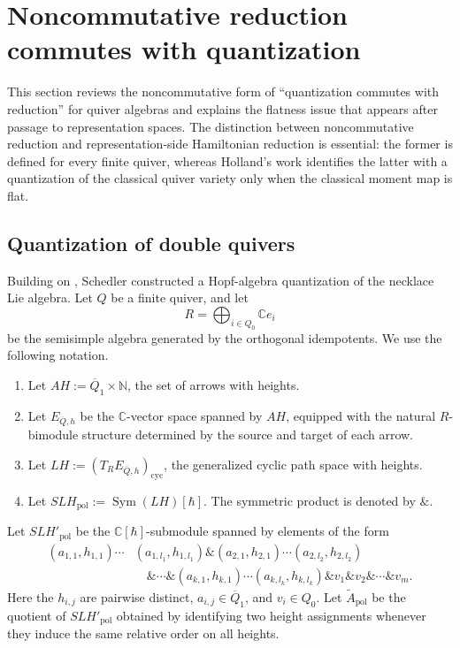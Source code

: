 \documentclass[11pt,reqno]{amsart}
\theoremstyle{definition}
\newcommand{\bbC}{\mathbb{C}}
\newcommand{\cyc}{\mathrm{cyc}}
\begin{document}
\section{Noncommutative reduction commutes with quantization}\label{sec: noncom Ham red}

This section reviews the noncommutative form of ``quantization commutes with reduction'' for quiver algebras and explains the flatness issue that appears after passage to representation spaces.
The distinction between noncommutative reduction and representation-side Hamiltonian reduction is essential: the former is defined for every finite quiver, whereas Holland's work identifies the latter with a quantization of the classical quiver variety only when the classical moment map is flat.

\subsection{Quantization of double quivers}
\label{subsec: nc quant}


Building on \cite{Tur1991Ske}, Schedler \cite{Sch2005} constructed a
Hopf-algebra quantization of the necklace Lie algebra.
Let \(Q\) be a finite quiver, and let
\[
R=\bigoplus_{i\in Q_0}\bbC e_i
\]
be the semisimple algebra generated by the orthogonal idempotents. We use the following notation.
\begin{enumerate}
\item Let \(AH:=\overline{Q}_1\times\mathbb{N}\), {the set of arrows with heights}.

\item Let \(E_{\overline{Q},h}\) be the \(\mathbb{C}\)-vector space spanned by \(AH\), {equipped with the natural \(R\)-bimodule structure determined by the source and target of each arrow.}

\item Let \(LH:=(T_RE_{\overline{Q},h})_\cyc\), {the generalized cyclic path space with heights}.

\item Let \(SLH_{\mathrm{pol}}:=\operatorname{Sym}(LH)[\hbar]\). The symmetric product is denoted by \(\&\).
\end{enumerate}

Let \(SLH'_{\mathrm{pol}}\) be the \(\mathbb{C}[\hbar]\)-submodule
spanned by elements of the form
\begin{equation}
\label{general form}
\begin{split}
(a_{1,1},h_{1,1})\cdots&(a_{1,l_1},h_{1,l_1})
\&
(a_{2,1},h_{2,1})\cdots(a_{2,l_2},h_{2,l_2})
\\
&\quad \&\cdots\&
(a_{k,1},h_{k,1})\cdots(a_{k,l_k},h_{k,l_k})
\&v_1\&v_2\&\cdots\&v_m.
\end{split}
\end{equation}
Here the \(h_{i,j}\) are pairwise distinct, \(a_{i,j}\in\overline Q_1\), and \(v_i\in Q_0\).
Let \(\widetilde A_{\mathrm{pol}}\) be the quotient of
\(SLH'_{\mathrm{pol}}\) obtained by identifying two height assignments
whenever they induce the same relative order on all heights.
\end{document}
